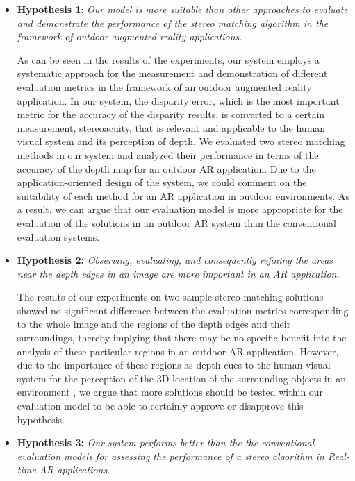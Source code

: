 \begin{itemize}
\item \textbf{Hypothesis 1}: \emph{Our model is more suitable than other approaches to evaluate and demonstrate
the performance of the stereo matching algorithm in the framework of 
outdoor augmented reality applications.} 

As can be seen in the results of the experiments, our system employs a systematic approach for the measurement and demonstration of different 
evaluation metrics in the framework of an outdoor augmented reality application. 
In our system, the disparity error, which is the most important metric for the accuracy of the disparity results, 
is converted to a certain measurement, stereoacuity, that is relevant and applicable to the human visual
system and its perception of depth. We evaluated two stereo matching methods in our system and analyzed their performance in terms of
the accuracy of the depth map for an outdoor AR application. Due to the application-oriented design of the system, we could comment on the suitability of each method
for an AR application in outdoor environments. As a result, we can argue that our evaluation model is more appropriate for the evaluation of the solutions 
in an outdoor AR system than the conventional evaluation systems.

\item \textbf{Hypothesis 2:} \emph{Observing, evaluating, and consequently 
refining the areas near the depth edges in an image are more important in an AR application.}

The results of our experiments on two sample stereo matching solutions showed no significant difference between the evaluation metrics corresponding to the whole image and
the regions of the depth edges and their surroundings, thereby implying that there may be no specific benefit into the analysis of these particular regions 
in an outdoor AR application.
However, due to the importance of these regions as depth cues to the human visual system for the perception of the 3D location of the surrounding 
objects in an environment \cite{sze11}, we argue that more solutions should be tested within our evaluation model 
to be able to certainly approve or disapprove this hypothesis. 

\item \textbf{Hypothesis 3:} \emph{Our system performs better than the the conventional evaluation models for assessing the performance of a stereo algorithm in
Real-time AR applications.}


\end{itemize}
